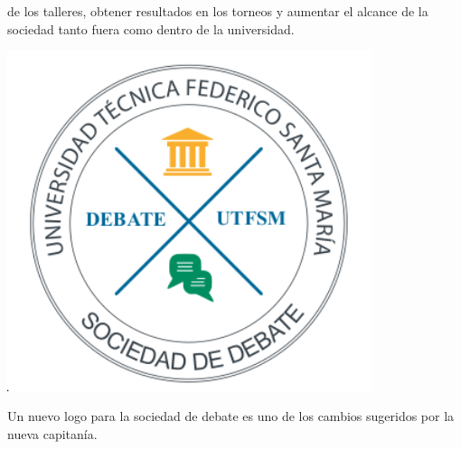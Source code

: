 \documentclass{article}
\begin{document}
\begin{adjustwidth}{-1.5cm}{-1.5cm}
\begin{minipage}{0.7\textwidth}
		de los talleres, obtener resultados en los torneos y aumentar el alcance
		de la sociedad tanto fuera como dentro de la universidad.
	\end{minipage}
	\hfill
	\begin{minipage}{0.5\textwidth}
		\begin{center}
			\includegraphics[width=0.8\textwidth]{logo_debate.png}
		\end{center}
		Un nuevo logo\cite{logo} para la sociedad de debate es uno de los
		cambios sugeridos por la nueva capitanía.
	\end{minipage}


\end{adjustwidth}
\end{document}

